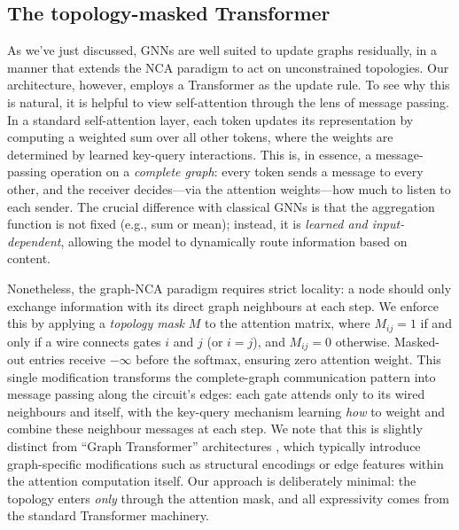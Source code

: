 \subsection*{The topology-masked Transformer}
As we've just discussed, GNNs are well suited to update graphs residually, in a manner that extends the NCA paradigm to act on unconstrained topologies. Our architecture, however, employs a Transformer as the update rule. To see why this is natural, it is helpful to view self-attention through the lens of message passing. In a standard self-attention layer, each token updates its representation by computing a weighted sum over all other tokens, where the weights are determined by learned key-query interactions. This is, in essence, a message-passing operation on a \textit{complete graph}: every token sends a message to every other, and the receiver decides---via the attention weights---how much to listen to each sender. The crucial difference with classical GNNs is that the aggregation function is not fixed (e.g., sum or mean); instead, it is \textit{learned and input-dependent}, allowing the model to dynamically route information based on content.

Nonetheless, the graph-NCA paradigm requires strict locality: a node should only exchange information with its direct graph neighbours at each step. We enforce this by applying a \textit{topology mask} $M$ to the attention matrix, where $M_{ij}=1$ if and only if a wire connects gates $i$ and $j$ (or $i=j$), and $M_{ij}=0$ otherwise. Masked-out entries receive $-\infty$ before the softmax, ensuring zero attention weight. This single modification transforms the complete-graph communication pattern into message passing along the circuit's edges: each gate attends only to its wired neighbours and itself, with the key-query mechanism learning \textit{how} to weight and combine these neighbour messages at each step. We note that this is slightly distinct from ``Graph Transformer'' architectures \citep{dwivedi2021generalizationtransformernetworksgraphs}, which typically introduce graph-specific modifications such as structural encodings or edge features within the attention computation itself. Our approach is deliberately minimal: the topology enters \textit{only} through the attention mask, and all expressivity comes from the standard Transformer machinery. 


